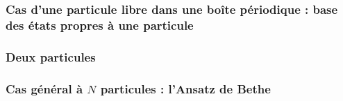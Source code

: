 \subsubsection{Cas d’une particule libre dans une boîte périodique : base des états propres à une particule}
\subsubsection{Deux particules}
\subsubsection{Cas général à \(N\) particules : l'Ansatz de Bethe}


